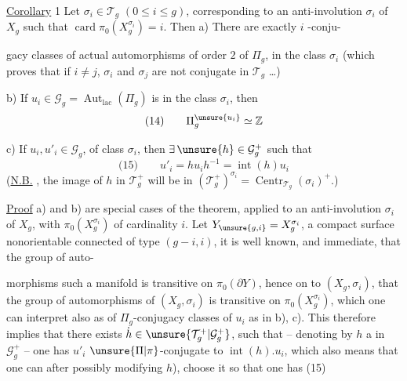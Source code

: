\uline{Corollary} 1 Let $\sigma_i\in\mathcal{T}_g$ $(0\leq i\leq g)$,
corresponding to an anti-involution $\sigma_i$ of
$X_g$ such that $\operatorname{card}\pi_0(X_g^{\sigma_i})=i$. Then
a) There are exactly $i$ -conju-

gacy classes of actual automorphisms of order $2$
of $\Pi_g$, in the class $\sigma_i$ (which proves
that if $i\neq j$, $\sigma_i$ and $\sigma_j$ are not
conjugate in $\mathcal{T}_g$  \dots)

b) If $u_i\in\mathcal{G}_g=\operatorname{Aut}_{\mathrm{lac}}(\Pi_g)$ is  in the
class $\sigma_i$, then 
\[
\text{(14)}\qquad \Pi_g^{\unsure{u_i}}\simeq\mathbb{Z}
\]

c) If $u_i,u'_i\in\mathcal{G}_g$, 
 of class $\sigma_i$, then $\exists\,\unsure{h}\in\mathcal{G}_g^+$
such that
\[
\text{(15)}\qquad u'_i=hu_ih^{-1}=\operatorname{int}(h)u_i
\]
(\uline{N.B.} , the image of $h$ in $\mathcal{T}_g^+$
will be in $(\mathcal{T}_g^+)^{\sigma_i}=\operatorname{Centr}_{\mathcal{T}_g}(\sigma_i)^+$.)

\uline{Proof} a) and b) are special
cases of the theorem, applied to
an anti-involution $\sigma_i$ of $X_g$, with
$\pi_0(X_g^{\sigma_i})$ of cardinality $i$. Let $Y_{\unsure{g,i}}=X_g^{\sigma_i}$,
a compact surface  nonorientable  connected
of type $(g-i,i)$, it is well known,
and immediate, that the group of auto-

morphisms  such a manifold is transitive
on $\pi_0(\partial Y)$, hence on  to $(X_g,\sigma_i)$, that
the group of automorphisms of $(X_g,\sigma_i)$ is transitive
on $\pi_0(X_g^{\sigma_i})$,  which one can interpret
also as  of $\Pi_g$-conjugacy classes
of $u_i$ as in b), c). This
therefore implies that there exists $\dot{h}\in\unsure{\mathcal{T}_g^+|\mathcal{G}_g^+}$,  such that
-- denoting by $h$ a  in $\mathcal{G}_g^+$ --
one has $u'_i$ $\unsure{\Pi|\pi}$-conjugate to $\operatorname{int}(h).u_i$, which
also means that one can after possibly modifying
$h$), choose it so that one has (15)

